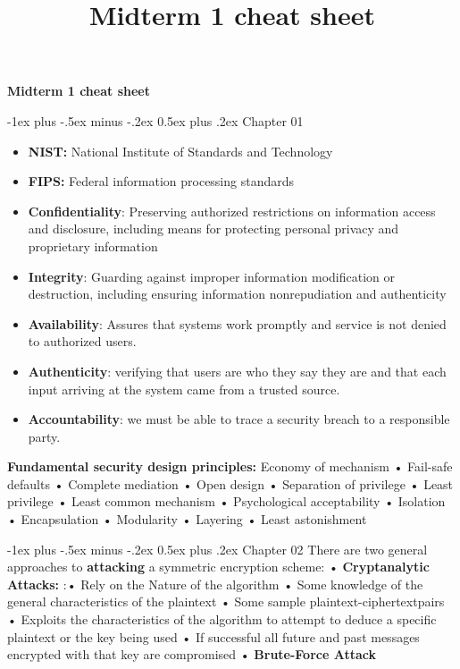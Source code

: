\documentclass[10pt,landscape]{article}
\title{Midterm 1 cheat sheet}
\makeatletter
\renewcommand{\section}{\@startsection{section}{1}{0mm}%
    {-1ex plus -.5ex minus -.2ex}%
    {0.5ex plus .2ex}%
    {\normalfont\large\bfseries}}
\makeatother
\begin{document}
\raggedright
\footnotesize

\begin{center}
    \Large{\textbf{Midterm 1 cheat sheet}} \\
\end{center}
\begin{multicols}{3}
\setlength{\premulticols}{1pt}
\setlength{\postmulticols}{1pt}
\setlength{\multicolsep}{1pt}
\setlength{\columnsep}{2pt}

\section{Chapter 01}
\begin{itemize}
\item \textbf{NIST: }National Institute of Standards and Technology
\item \textbf{FIPS: }Federal information processing standards
\end{itemize}

\begin{itemize}
\item \textbf{Confidentiality}: Preserving authorized restrictions on information access and disclosure, including means for protecting personal privacy and proprietary information
\item \textbf{Integrity}: Guarding against improper information modification or destruction, including ensuring information nonrepudiation and authenticity
\item \textbf{Availability}: Assures that systems work promptly and service is not denied to authorized users.
\item \textbf{Authenticity}: verifying that users are who they say they are and that each input arriving at the system came from a trusted source.
\item \textbf{Accountability}: we must be able to trace a security breach to a responsible party.
\end{itemize}

\textbf{Fundamental security design principles:} Economy of mechanism
• Fail-safe defaults • Complete mediation • Open design • Separation
of privilege • Least privilege • Least common mechanism •
Psychological acceptability • Isolation • Encapsulation • Modularity •
Layering • Least astonishment

\section{Chapter 02}
There are two general approaches to \textbf{attacking} a symmetric encryption scheme: •
\textbf{Cryptanalytic Attacks:} :• Rely on the Nature of the algorithm • Some knowledge of the general
characteristics of the plaintext • Some sample plaintext-ciphertextpairs • Exploits the
characteristics of the algorithm to attempt to deduce a specific plaintext or the key being used •
If successful all future and past messages encrypted with that key are compromised •
\textbf{Brute-Force Attack}


\end{multicols}
\end{document}
